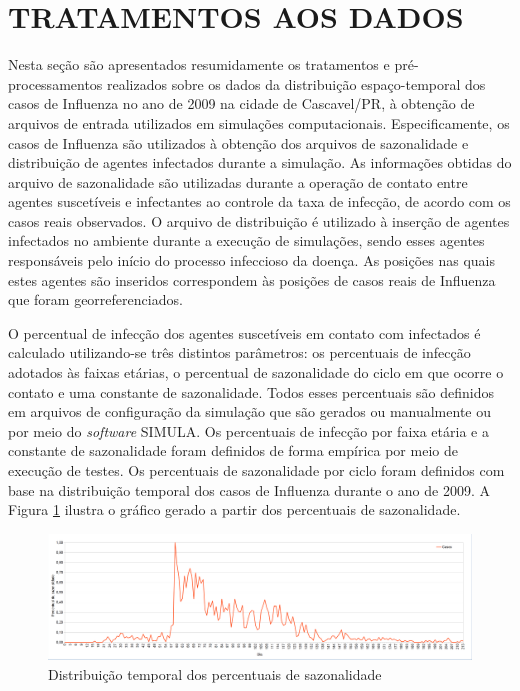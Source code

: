 \section{TRATAMENTOS AOS DADOS}
\label{sec:tratamentosDados}

Nesta seção são apresentados resumidamente os tratamentos e pré-processamentos realizados sobre os dados da distribuição espaço-temporal dos casos de Influenza no ano de 2009 na cidade de Cascavel/PR, à obtenção de arquivos de entrada utilizados em simulações computacionais. Especificamente, os casos de Influenza são utilizados à obtenção dos arquivos de sazonalidade e distribuição de agentes infectados durante a simulação. As informações obtidas do arquivo de sazonalidade são utilizadas durante a operação de contato entre agentes suscetíveis e infectantes ao controle da taxa de infecção, de acordo com os casos reais observados. O arquivo de distribuição é utilizado à inserção de agentes infectados no ambiente durante a execução de simulações, sendo esses agentes responsáveis pelo início do processo infeccioso da doença. As posições nas quais estes agentes são inseridos correspondem às posições de casos reais de Influenza que foram georreferenciados. 

O percentual de infecção dos agentes suscetíveis em contato com infectados é calculado utilizando-se três distintos parâmetros: os percentuais de infecção adotados às faixas etárias, o percentual de sazonalidade do ciclo em que ocorre o contato e uma constante de sazonalidade. Todos esses percentuais são definidos em arquivos de configuração da simulação que são gerados ou manualmente ou por meio do \textit{software} SIMULA. Os percentuais de infecção por faixa etária e a constante de sazonalidade foram definidos de forma empírica por meio de execução de testes. Os percentuais de sazonalidade por ciclo foram definidos com base na distribuição temporal dos casos de Influenza durante o ano de 2009. A Figura \ref{fig:percentuais_sazonalidade} ilustra o gráfico gerado a partir dos percentuais de sazonalidade.

\begin{figure}[H]
  \centering
  \includegraphics[width=1\textwidth]{Figuras/TratamentosDados/Sazonalidade.png}
  \caption{Distribuição temporal dos percentuais de sazonalidade}
  \label{fig:percentuais_sazonalidade}
\end{figure} 

